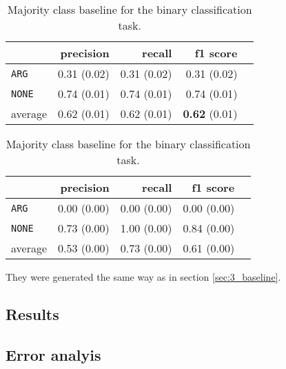 \begin{table}[!htb]
    \begin{minipage}{.5\linewidth}
      \caption{Random (stratified) baseline for the binary classification task.}
      \label{tbl:binmaj}
      \centering
      
\begin{tabular}{@{}lrrrr@{}}
\toprule
 	&	 precision &	 recall &	 f1 score  \\ \midrule 
\texttt{ARG}	&	 0.31 \scriptsize{(0.02)} &	 0.31 \scriptsize{(0.02)} &	 0.31 \scriptsize{(0.02)}  \\ 
\texttt{NONE}	&	 0.74 \scriptsize{(0.01)} &	 0.74 \scriptsize{(0.01)} &	 0.74 \scriptsize{(0.01)}  \\ 
average	&	 0.62 \scriptsize{(0.01)} &	 0.62 \scriptsize{(0.01)} &	 \textbf{0.62} \scriptsize{(0.01)}  \\ 
\bottomrule
\end{tabular}

  \end{minipage}%
    \begin{minipage}{.5\linewidth}
      \centering
        \caption{Majority class baseline for the binary classification task.}
        \label{tbl:binstrat}
\begin{tabular}{@{}lrrrr@{}}
\toprule
 	&	 precision &	 recall &	 f1 score  \\ \midrule 
\texttt{ARG}	&	 0.00 \scriptsize{(0.00)} &	 0.00 \scriptsize{(0.00)} &	 0.00 \scriptsize{(0.00)}  \\ 
\texttt{NONE}	&	 0.73 \scriptsize{(0.00)} &	 1.00 \scriptsize{(0.00)} &	 0.84 \scriptsize{(0.00)}  \\ 
average	&	 0.53 \scriptsize{(0.00)} &	 0.73 \scriptsize{(0.00)} &	 0.61 \scriptsize{(0.00)}  \\ 
\bottomrule
\end{tabular}
    \end{minipage} 
\end{table}
They were generated the same way as in section \ref{sec:3_baseline}.





\subsection{Results}
\subsection{Error analyis}
